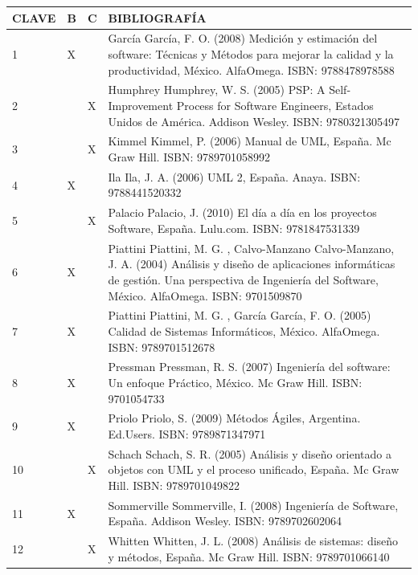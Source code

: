 \documentclass[10pt]{article}
\begin{document}
\begin{table}[H]
  \begin{tabular}{|p{}|p{}|p{}|p{}|}
    \hline

    \textbf{CLAVE} & \textbf{B} & \textbf{C} & \textbf{BIBLIOGRAFÍA}\\\hline
    1&X &  &García García, F. O. (2008) Medición y estimación del software: Técnicas y Métodos para mejorar la calidad y la productividad, México. AlfaOmega. ISBN: 9788478978588\\ 2& & X &Humphrey Humphrey, W. S. (2005) PSP: A Self-Improvement Process for Software Engineers, Estados Unidos de América. Addison Wesley. ISBN: 9780321305497\\ 3& & X &Kimmel Kimmel, P. (2006) Manual de UML, España. Mc Graw Hill. ISBN: 9789701058992\\ 4&X &  &Ila Ila, J. A. (2006) UML 2, España. Anaya. ISBN: 9788441520332\\ 5& & X &Palacio Palacio, J. (2010) El día a día en los proyectos Software, España. Lulu.com. ISBN: 9781847531339\\ 6&X &  &Piattini Piattini, M. G. , Calvo-Manzano Calvo-Manzano, J. A. (2004) Análisis y diseño de aplicaciones informáticas de gestión. Una perspectiva de Ingeniería del Software, México. AlfaOmega. ISBN: 9701509870\\ 7&X &  &Piattini Piattini, M. G. , García García, F. O. (2005) Calidad de Sistemas Informáticos, México. AlfaOmega. ISBN: 9789701512678\\ 8&X &  &Pressman Pressman, R. S. (2007) Ingeniería del software: Un enfoque Práctico, México. Mc Graw Hill. ISBN: 9701054733\\ 9&X &  &Priolo Priolo, S. (2009) Métodos Ágiles, Argentina. Ed.Users. ISBN: 9789871347971\\ 10& & X &Schach Schach, S. R. (2005) Análisis y diseño orientado a objetos con UML y el proceso unificado, España. Mc Graw Hill. ISBN: 9789701049822\\ 11&X &  &Sommerville Sommerville, I. (2008) Ingeniería de Software, España. Addison Wesley. ISBN: 9789702602064\\ 12& & X &Whitten Whitten, J. L. (2008) Análisis de sistemas: diseño y métodos, España. Mc Graw Hill. ISBN: 9789701066140\\ 

    \hline
  \end{tabular}
\end{table}
\end{document}
